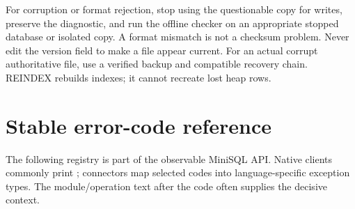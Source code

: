 For corruption or format rejection, stop using the questionable copy for writes, preserve the diagnostic, and run the offline checker on an appropriate stopped database or isolated copy. A format mismatch is not a checksum problem. Never edit the version field to make a file appear current. For an actual corrupt authoritative file, use a verified backup and compatible recovery chain. REINDEX rebuilds indexes; it cannot recreate lost heap rows.

\section{Stable error-code reference}

The following registry is part of the observable MiniSQL API. Native clients commonly print ; connectors map selected codes into language-specific exception types. The module/operation text after the code often supplies the decisive context.


